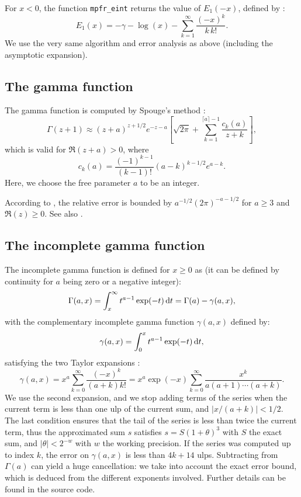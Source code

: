 \documentclass[12pt]{amsart}
\begin{document}
\bigskip

For $x < 0$, the function \verb|mpfr_eint| returns the value of 
$E_1(-x)$, defined by \cite[formula 5.1.11]{AbSt73}:
\[ E_1(x) = -\gamma - \log(x) - \sum_{k=1}^{\infty} \frac{(-x)^k}{k \, k!}.\]
We use the very same algorithm and error analysis as above (including the
asymptotic expansion).

\subsection{The gamma function}


The gamma function is computed by Spouge's method \cite{Spouge94}:
\[
\Gamma(z+1) \approx (z+a)^{z+1/2} e^{-z-a} \left[ \sqrt{2 \pi} +
 \sum_{k=1}^{\lceil a \rceil - 1} \frac{c_k(a)}{z+k} \right], \]
which is valid for $\Re(z+a) > 0$, where
\[ c_k(a) = \frac{(-1)^{k-1}}{(k-1)!} (a-k)^{k-1/2} e^{a-k}. \]
Here, we choose the free parameter $a$ to be an integer.

According to \cite[Section 2.6]{Pugh04}, the relative error is bounded by
$a^{-1/2} (2\pi)^{-a-1/2}$ for $a \ge 3$ and $\Re(z) \ge 0$.
See also \cite{Smith01}.

\subsection{The incomplete gamma function}

The incomplete gamma function is defined for $x \geq 0$ as
(it can be defined by continuity for $a$ being zero or a negative integer):
\[ \Gamma(a,x) = \int_x^{\infty} t^{a-1} \exp(-t) \, {\rm d}t
               = \Gamma(a) - \gamma(a,x), \]
with the complementary incomplete gamma function $\gamma(a,x)$ defined by:
\[ \gamma(a,x) = \int_0^x t^{a-1} \exp(-t) \, {\rm d}t, \]
satisfying the two Taylor expansions \cite[formula 6.5.29]{AbSt73}:
\[
\gamma(a,x) = x^a \sum_{k=0}^{\infty} \frac{(-x)^k}{(a+k) k!}
            = x^a \exp(-x) \sum_{k=0}^{\infty} \frac{x^k}{a (a+1) \cdots
                  (a+k)}.
\]
We use the second expansion, and we stop adding terms of the series when the
current term is less than one ulp of the current sum, and $|x/(a+k)| < 1/2$.
The last condition ensures that the tail of the series is less than twice the
current term, thus the approximated sum $s$ satisfies $s = S (1 + \theta)^3$
with $S$ the exact sum, and $|\theta| < 2^{-w}$ with $w$ the working
precision. If the series was computed up to index $k$, the error on
$\gamma(a,x)$ is less than $4k+14$ ulps.
Subtracting from $\Gamma(a)$ can yield a huge cancellation: we take into
account the exact error bound, which is deduced from the different exponents
involved. Further details can be found in the source code.
\end{document}
